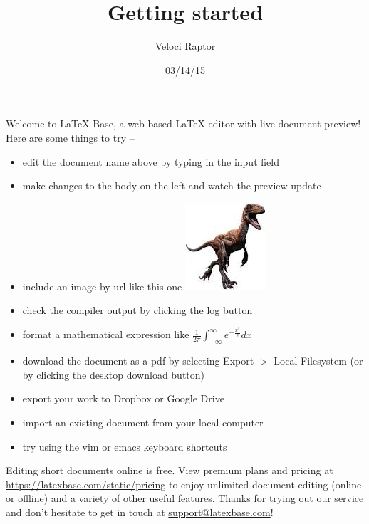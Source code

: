 \documentclass[12pt]{article}
\title{Getting started}
\author{Veloci Raptor}
\date{03/14/15}
\begin{document}
\maketitle

Welcome to LaTeX Base, a web-based \LaTeX{} editor with live document preview!
Here are some things to try --

\begin{itemize}
  \item edit the document name above by typing in the input field
  \item make changes to the body on the left and watch the preview update
  \item include an image by url like this one
        \hspace*{3em}
        \includegraphics{media/raptor.jpg}
  \item check the compiler output by clicking the log button
  \item format a mathematical expression like
        $\frac{1}{2\pi}\int_{-\infty}^{\infty}e^{-\frac{x^2}{2}}dx$
  \item download the document as a pdf by selecting Export $>$ Local
        Filesystem (or by clicking the desktop download button)
  \item export your work to Dropbox or Google Drive
  \item import an existing document from your local computer
  \item try using the vim or emacs keyboard shortcuts
\end{itemize}

Editing short documents online is free. View premium plans and pricing at
\url{https://latexbase.com/static/pricing} to enjoy unlimited document editing
(online or offline) and a variety of other useful features. Thanks for trying
out our service and don't hesitate to get in touch at
\href{mailto:support@latexbase.com}{support@latexbase.com}!
\end{document}
